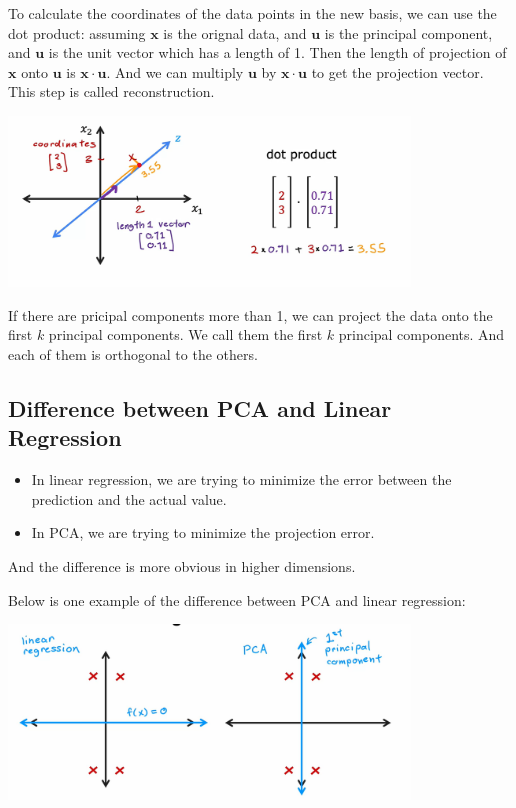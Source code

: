 To calculate the coordinates of the data points in the new basis, we can use the dot product:
assuming $\mathbf{x}$ is the orignal data, and $\mathbf{u}$ is the principal component,
and $\mathbf{u}$ is the unit vector which has a length of 1.
Then the length of projection of $\mathbf{x}$ onto $\mathbf{u}$ is $\mathbf{x} \cdot \mathbf{u}$.
And we can multiply $\mathbf{u}$ by $\mathbf{x} \cdot \mathbf{u}$ to get the projection vector.
This step is called reconstruction.
\begin{center}
    \includegraphics*[width=0.8\textwidth]{images/p4}
\end{center}
\par

If there are pricipal components more than 1, we can project the data onto the first $k$ principal components.
We call them the first $k$ principal components. And each of them is orthogonal to the others.

\subsection*{Difference between PCA and Linear Regression}
\begin{itemize}
    \item In linear regression, we are trying to minimize the error between the prediction and the actual value.
    \item In PCA, we are trying to minimize the projection error.
\end{itemize}
\par

And the difference is more obvious in higher dimensions.\par
Below is one example of the difference between PCA and linear regression:
\begin{center}
    \includegraphics*[width=0.8\textwidth]{images/p8}
\end{center}

